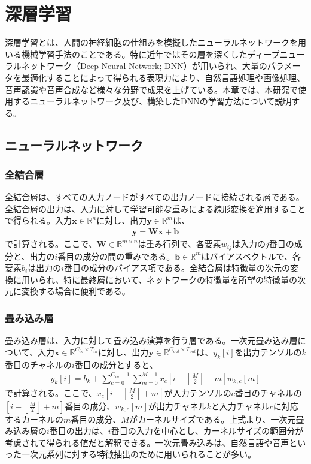 \documentclass[12pt]{jarticle}
\numberwithin{equation}{section}    %
\numberwithin{figure}{section}      %
\numberwithin{table}{section}      %
\begin{document}
\section{深層学習}
深層学習とは、人間の神経細胞の仕組みを模擬したニューラルネットワークを用いる機械学習手法のことである。特に近年ではその層を深くしたディープニューラルネットワーク（Deep Neural Network; DNN）が用いられ、大量のパラメータを最適化することによって得られる表現力により、自然言語処理や画像処理、音声認識や音声合成など様々な分野で成果を上げている。本章では、本研究で使用するニューラルネットワーク及び、構築したDNNの学習方法について説明する。

\subsection{ニューラルネットワーク}
\subsubsection{全結合層}
全結合層は、すべての入力ノードがすべての出力ノードに接続される層である。全結合層の出力は、入力に対して学習可能な重みによる線形変換を適用することで得られる。入力$\bm{x} \in \mathbb{R}^{n}$に対し、出力$\bm{y} \in \mathbb{R}^{m}$は、
\begin{align}
    \bm{y} = \bm{W}\bm{x} + \bm{b}
\end{align}
で計算される。ここで、$\bm{W} \in \mathbb{R}^{m \times n}$は重み行列で、各要素$w_{ij}$は入力の$j$番目の成分と、出力の$i$番目の成分の間の重みである。$\bm{b} \in \mathbb{R}^{m}$はバイアスベクトルで、各要素$b_{i}$は出力の$i$番目の成分のバイアス項である。全結合層は特徴量の次元の変換に用いられ、特に最終層において、ネットワークの特徴量を所望の特徴量の次元に変換する場合に便利である。

\subsubsection{畳み込み層}
畳み込み層は、入力に対して畳み込み演算を行う層である。一次元畳み込み層について、入力$\bm{x} \in \mathbb{R}^{C_{in} \times T_{in}}$に対し、出力$\bm{y} \in \mathbb{R}^{C_{out} \times T_{out}}$は、$y_{k}[i]$を出力テンソルの$k$番目のチャネルの$i$番目の成分とすると、
\begin{align}
    y_{k}[i] = b_{k} + \sum_{c=0}^{C_{in} - 1} \sum_{m = 0}^{M - 1} x_{c}\left[i - \left\lfloor \frac{M}{2} \right\rfloor + m\right] w_{k, c}[m]
\end{align}
で計算される。ここで、$x_{c}\left[i - \left\lfloor \frac{M}{2} \right\rfloor + m\right]$が入力テンソルの$c$番目のチャネルの$\left[i - \left\lfloor \frac{M}{2} \right\rfloor + m\right]$番目の成分、$w_{k, c}[m]$が出力チャネル$k$と入力チャネル$c$に対応するカーネルの$m$番目の成分、$M$がカーネルサイズである。上式より、一次元畳み込み層の$i$番目の出力は、$i$番目の入力を中心とし、カーネルサイズの範囲分が考慮されて得られる値だと解釈できる。一次元畳み込みは、自然言語や音声といった一次元系列に対する特徴抽出のために用いられることが多い。
\end{document}
